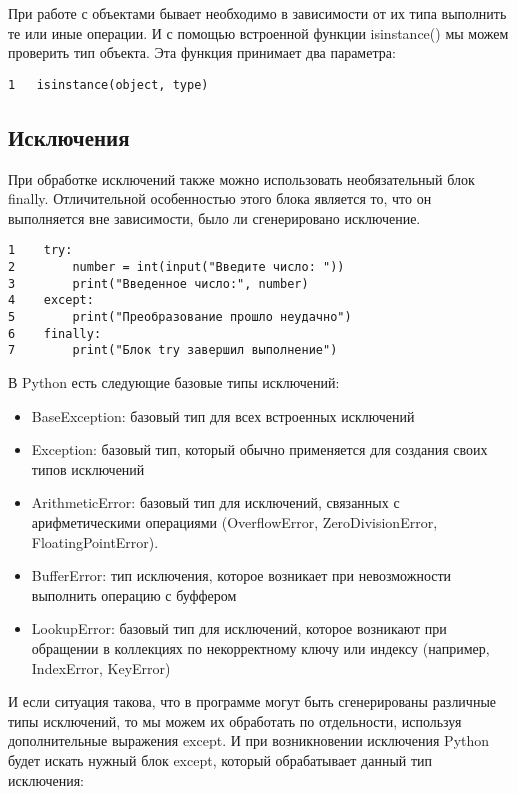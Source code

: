 \documentclass[12pt, a4paper]{article}
\begin{document}
При работе с объектами бывает необходимо в зависимости от их типа выполнить те или иные операции. И с помощью встроенной функции isinstance() мы можем проверить тип объекта. Эта функция принимает два параметра:

\begin{verbatim}	
1   isinstance(object, type)
\end{verbatim}

\subsection{Исключения}

При обработке исключений также можно использовать необязательный блок finally. Отличительной особенностью этого блока является то, что он выполняется вне зависимости, было ли сгенерировано исключение.

\begin{verbatim}
1    try:
2        number = int(input("Введите число: "))
3        print("Введенное число:", number)
4    except:
5        print("Преобразование прошло неудачно")
6    finally:
7        print("Блок try завершил выполнение")
\end{verbatim}

В Python есть следующие базовые типы исключений:

\begin{itemize}
    \item BaseException: базовый тип для всех встроенных исключений
    \item Exception: базовый тип, который обычно применяется для создания своих типов исключений
    \item ArithmeticError: базовый тип для исключений, связанных с арифметическими операциями (OverflowError, ZeroDivisionError, FloatingPointError).
    \item BufferError: тип исключения, которое возникает при невозможности выполнить операцию с буффером
    \item LookupError: базовый тип для исключений, которое возникают при обращении в коллекциях по некорректному ключу или индексу (например, IndexError, KeyError)
\end{itemize}

\newpage

И если ситуация такова, что в программе могут быть сгенерированы различные типы исключений, то мы можем их обработать по отдельности, используя дополнительные выражения except. И при возникновении исключения Python будет искать нужный блок except, который обрабатывает данный тип исключения:
\end{document}
